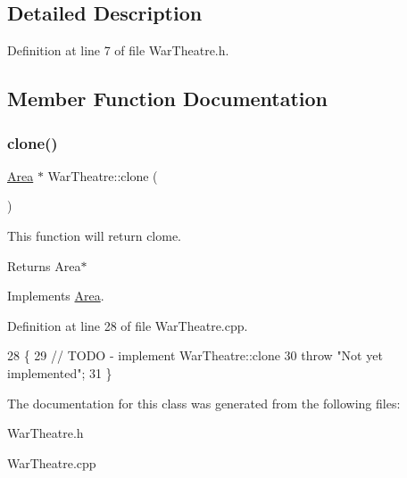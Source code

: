 \subsection{Detailed Description}


Definition at line 7 of file War\+Theatre.\+h.



\subsection{Member Function Documentation}
\mbox{\label{classWarTheatre_a501f851edf6f5ad00770414e50505175}} 
\subsubsection{\texorpdfstring{clone()}{clone()}}
{\footnotesize\ttfamily \hyperlink{classArea}{Area} $\ast$ War\+Theatre\+::clone (\begin{DoxyParamCaption}{ }\end{DoxyParamCaption})\hspace{0.3cm}{\ttfamily [virtual]}}



This function will return clome. 

\begin{DoxyReturn}{Returns}
Area$\ast$ 
\end{DoxyReturn}


Implements \hyperlink{classArea_a383d61c76b8fac66ef903036d776a3a4}{Area}.



Definition at line 28 of file War\+Theatre.\+cpp.


\begin{DoxyCode}
28                         \{
29     \textcolor{comment}{// TODO - implement WarTheatre::clone}
30     \textcolor{keywordflow}{throw} \textcolor{stringliteral}{"Not yet implemented"};
31 \}
\end{DoxyCode}


The documentation for this class was generated from the following files\+:\begin{DoxyCompactItemize}
\item 
War\+Theatre.\+h\item 
War\+Theatre.\+cpp\end{DoxyCompactItemize}
